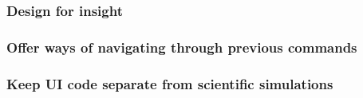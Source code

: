 \subsubsection{Design for insight}

\subsubsection{Offer ways of navigating through previous commands}

\subsubsection{Keep UI code separate from scientific simulations}



